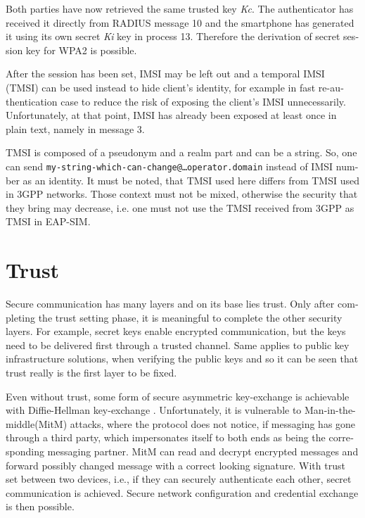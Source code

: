 \documentclass[12pt,a4paper,english]{tutthesis}
\begin{document}
\begin{otherlanguage}{english}
Both parties have now retrieved the same trusted key \emph{Kc}. The
authenticator has received it directly from RADIUS message 10 and the
smartphone has generated it using its own secret \emph{Ki} key in
process 13.
Therefore the derivation of secret session key for WPA2 is possible.

After the session has been set, IMSI may be left out and a temporal IMSI
(TMSI) can be used instead to hide client's identity, for example in
fast re-authentication case to reduce the risk of exposing the client's
IMSI unnecessarily. Unfortunately, at that point, IMSI has already
been exposed at least once in plain text, namely in message 3.

TMSI is composed of a pseudonym and a realm part and can be a
string. So, one can send 
\texttt{my-string-which-can-change@…operator.domain} instead of 
IMSI number as an identity. 
It must be noted, that TMSI used here differs from TMSI used in 3GPP
networks. Those context must not be mixed, otherwise the security that
they bring may decrease, i.e. one must not use the TMSI received from
3GPP as TMSI in EAP-SIM.
\section{Trust}
\label{sec-2-7}

Secure communication has many layers and on its base lies trust. 
Only after completing the trust setting phase, it is meaningful to complete
the other security layers. For example, secret keys enable encrypted
communication, but the keys need to be delivered first through a trusted
channel. Same applies to public key infrastructure solutions, when
verifying the public keys and so it can be seen that trust
really is the first layer to be fixed.



Even without trust, some form of secure asymmetric key-exchange is achievable
with Diffie-Hellman key-exchange \cite{diffie1976new}. Unfortunately, it is vulnerable
to Man-in-the-middle(MitM) attacks, where the protocol does not notice, 
if messaging has gone through a third party, which impersonates itself to 
both ends as being the corresponding messaging partner. MitM can
read and decrypt encrypted messages and forward possibly changed message with
a correct looking signature.
With trust set between two devices, i.e.,  if they can securely
authenticate each other, secret communication is achieved. 
Secure network configuration and credential exchange is then possible.



\end{otherlanguage}
\end{document}
